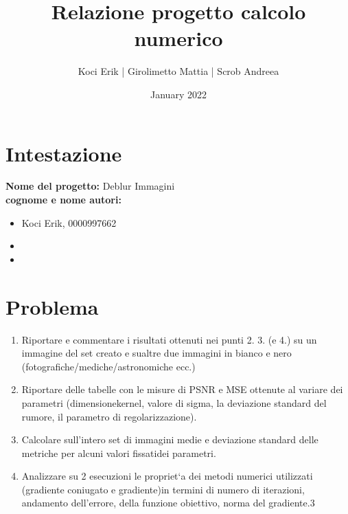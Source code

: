 \documentclass{article}
\title{Relazione progetto calcolo numerico}
\author{Koci Erik | Girolimetto Mattia | Scrob Andreea}
\date{January 2022}
\begin{document}
\maketitle

\section{Intestazione}
\textbf{Nome del progetto:} Deblur Immagini\\
\textbf{cognome e nome autori:}
\begin{itemize}
    \item Koci Erik, 0000997662
    \item
    \item
\end{itemize}

\section{Problema}
\begin{enumerate}
    \item Riportare e commentare i risultati ottenuti nei punti 2. 3. (e 4.) su un immagine del set creato e sualtre due immagini in bianco e nero (fotografiche/mediche/astronomiche ecc.)
    \item Riportare delle tabelle con le misure di PSNR e MSE ottenute al variare dei parametri (dimensionekernel, valore di sigma, la deviazione standard del rumore, il parametro di regolarizzazione).
    \item Calcolare sull’intero set di immagini medie e deviazione standard delle metriche per alcuni valori fissatidei parametri.
    \item Analizzare su 2 esecuzioni le propriet`a dei metodi numerici utilizzati (gradiente coniugato e gradiente)in termini di numero di iterazioni, andamento dell'errore, della funzione obiettivo, norma del gradiente.3
\end{enumerate}
\end{document}
